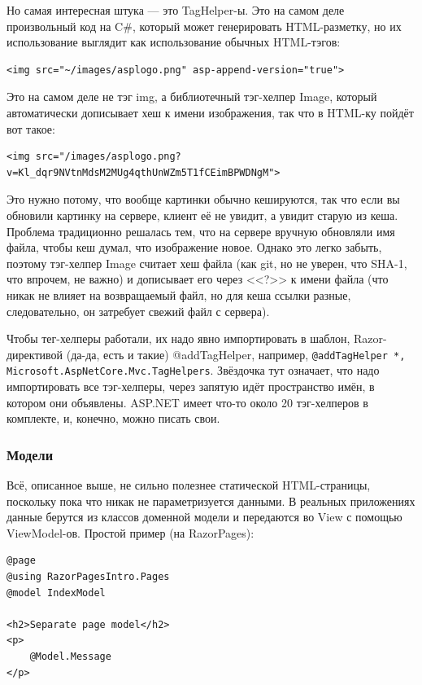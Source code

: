 \documentclass[a5paper]{article}
\begin{document}
Но самая интересная штука --- это TagHelper-ы. Это на самом деле произвольный код на C\#, который может генерировать HTML-разметку, но их использование выглядит как использование обычных HTML-тэгов:

\begin{verbatim}
<img src="~/images/asplogo.png" asp-append-version="true">
\end{verbatim}

Это на самом деле не тэг img, а библиотечный тэг-хелпер Image, который автоматически дописывает хеш к имени изображения, так что в HTML-ку пойдёт вот такое:

\begin{verbatim}
<img src="/images/asplogo.png?v=Kl_dqr9NVtnMdsM2MUg4qthUnWZm5T1fCEimBPWDNgM">
\end{verbatim}

Это нужно потому, что вообще картинки обычно кешируются, так что если вы обновили картинку на сервере, клиент её не увидит, а увидит старую из кеша. Проблема традиционно решалась тем, что на сервере вручную обновляли имя файла, чтобы кеш думал, что изображение новое. Однако это легко забыть, поэтому тэг-хелпер Image считает хеш файла (как git, но не уверен, что SHA-1, что впрочем, не важно) и дописывает его через <<?>> к имени файла (что никак не влияет на возвращаемый файл, но для кеша ссылки разные, следовательно, он затребует свежий файл с сервера).

Чтобы тег-хелперы работали, их надо явно импортировать в шаблон, Razor-директивой (да-да, есть и такие) @addTagHelper, например, \texttt{@addTagHelper *, Microsoft.AspNetCore.Mvc.TagHelpers}. Звёздочка тут означает, что надо импортировать все тэг-хелперы, через запятую идёт пространство имён, в котором они объявлены. ASP.NET имеет что-то около 20 тэг-хелперов в комплекте, и, конечно, можно писать свои.

\subsubsection{Модели}

Всё, описанное выше, не сильно полезнее статической HTML-страницы, поскольку пока что никак не параметризуется данными. В реальных приложениях данные берутся из классов доменной модели и передаются во View с помощью ViewModel-ов. Простой пример (на RazorPages):

\begin{verbatim}
@page
@using RazorPagesIntro.Pages
@model IndexModel

<h2>Separate page model</h2>
<p>
    @Model.Message
</p>
\end{verbatim}
\end{document}
